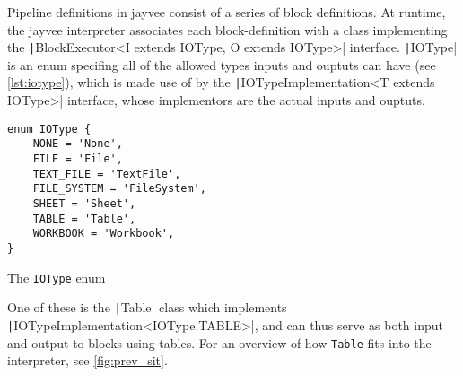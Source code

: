 Pipeline definitions in jayvee consist of a series of block definitions.
At runtime, the jayvee interpreter associates each block-definition with a class implementing the \texttt|BlockExecutor<I extends IOType, O extends IOType>| interface.
\texttt|IOType| is an enum specifing all of the allowed types inputs and ouptuts can have (see \ref{lst:iotype}), which is made use of by the \texttt|IOTypeImplementation<T extends IOType>| interface, whose implementors are the actual inputs and ouptuts.
\begin{listing}
	\begin{verbatim}
enum IOType {
	NONE = 'None',
	FILE = 'File',
	TEXT_FILE = 'TextFile',
	FILE_SYSTEM = 'FileSystem',
	SHEET = 'Sheet',
	TABLE = 'Table',
	WORKBOOK = 'Workbook',
}
\end{verbatim}
	\caption{The \texttt{IOType} enum}
	\label{lst:iotype}
\end{listing}
One of these is the \texttt|Table| class which implements \texttt|IOTypeImplementation<IOType.TABLE>|, and can thus serve as both input and output to blocks using tables.
For an overview of how \texttt{Table} fits into the interpreter, see \ref{fig:prev_sit}.
